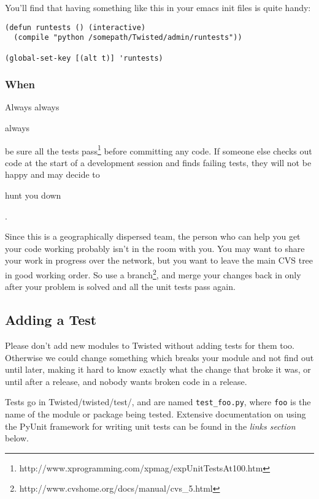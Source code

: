 You'll find that having something like this in your emacs init     files is quite handy:\begin{verbatim}
(defun runtests () (interactive)
  (compile "python /somepath/Twisted/admin/runtests"))

(global-set-key [(alt t)] 'runtests)
\end{verbatim}


\subsubsection{When}


Always always \begin{em}always\end{em} be sure all the      tests pass\footnote{http://www.xprogramming.com/xpmag/expUnitTestsAt100.htm} before committing any code.  If someone else      checks out code at the start of a development session and finds      failing tests, they will not be happy and may decide to \begin{em}hunt      you down\end{em}.

Since this is a geographically dispersed team, the person who     can help you get your code working probably isn't in the room with     you.  You may want to share your work in progress over the     network, but you want to leave the main CVS tree in good working     order.  So use a branch\footnote{http://www.cvshome.org/docs/manual/cvs\_5.html},     and merge your changes back in only after your problem is solved     and all the unit tests pass again.

\subsection{Adding a Test}


Please don't add new modules to Twisted without adding tests     for them too.  Otherwise we could change something which breaks     your module and not find out until later, making it hard to know     exactly what the change that broke it was, or until after a     release, and nobody wants broken code in a release.

Tests go in Twisted/twisted/test/, and are named \texttt{test\_foo.\linebreak[1]py},     where \texttt{foo} is the name of the module or package being tested.     Extensive documentation on using the PyUnit framework for writing     unit tests can be found in the \textit{links     section} below.

